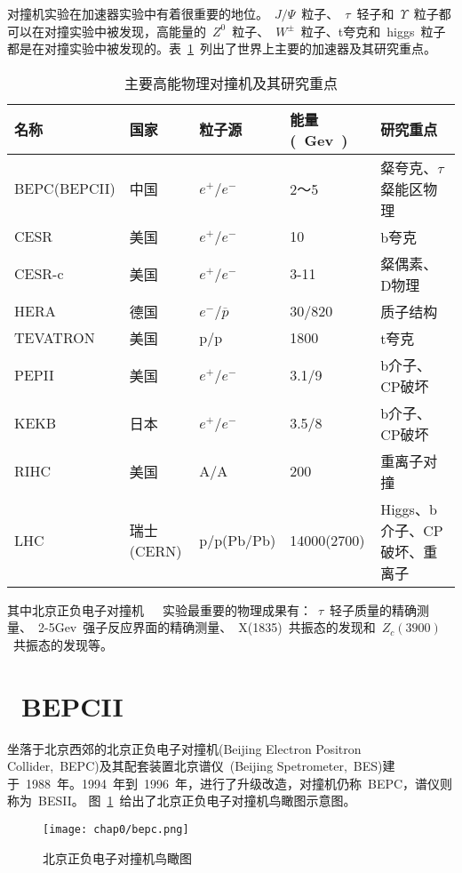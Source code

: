 对撞机实验在加速器实验中有着很重要的地位。~$J/\Psi$~粒子、~$\tau$~轻子和~$\Upsilon$~粒子都可以在对撞实验中被发现，高能量的~$Z^{0}$~粒子、~$W^{\pm}$~粒子、t夸克和~higgs~粒子都是在对撞实验中被发现的。表~\ref{tbl:collider-accelerator}~列出了世界上主要的加速器及其研究重点。

\begin{table}[h]
    \centering
    \caption{\label{tbl:collider-accelerator} 主要高能物理对撞机及其研究重点}
    \footnotesize
    \begin{tabular}{lllll}
        \hline
        名称& 国家& 粒子源& 能量(~Gev~)& 研究重点\\
        \hline
        BEPC(BEPCII)& 中国& $e^{+}$/$e^{-}$& 2～5& 粲夸克、$\tau$粲能区物理 \\
        CESR& 美国& $e^{+}$/$e^{-}$& 10& b夸克 \\
        CESR-c& 美国& $e^{+}$/$e^{-}$& 3-11& 粲偶素、D物理 \\
        HERA& 德国&  $e^{-}$/$\overline{p}$&30/820& 质子结构\\
        TEVATRON& 美国& p/p&1800& t夸克\\
        PEPII& 美国& $e^{+}$/$e^{-}$& 3.1/9& b介子、CP破坏\\
        KEKB& 日本&   $e^{+}$/$e^{-}$& 3.5/8& b介子、CP破坏\\
        RIHC& 美国& A/A& 200& 重离子对撞\\
        LHC& 瑞士(CERN)& p/p(Pb/Pb)& 14000(2700)& Higgs、b介子、CP破坏、重离子\\
        \hline
    \end{tabular}
\end{table}

其中北京正负电子对撞机~\cite{xiejl1996}~\cite{ihep:2003}~\cite{ihep:2006}实验最重要的物理成果有：~$\tau$~轻子质量的精确测量、~2-5Gev~强子反应界面的精确测量、~X(1835)~共振态的发现和~$Z_{c}(3900)$~\cite{BESIII:2013}共振态的发现等。

\section{~BEPCII~}

坐落于北京西郊的北京正负电子对撞机(Beijing Electron Positron Collider,~BEPC)及其配套装置北京谱仪~\cite{zhengzp2009}(Beijing Spetrometer,~BES)建于~1988~年。1994~年到~1996~年，进行了升级改造，对撞机仍称~BEPC，谱仪则称为~BESII。
图~\ref{fig:bepc}~给出了北京正负电子对撞机鸟瞰图示意图。
\begin{figure}[!h]
  \centering
  \texttt{[image: chap0/bepc.png]}
  \caption{北京正负电子对撞机鸟瞰图}
  \label{fig:bepc}
\end{figure}

